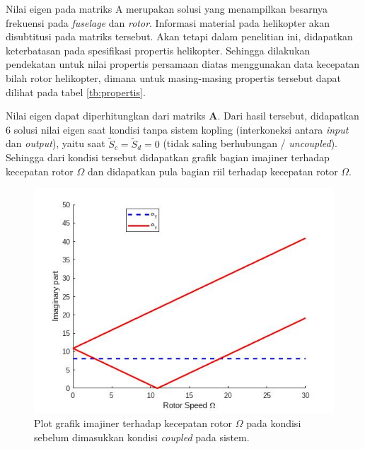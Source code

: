 Nilai eigen pada matriks A merupakan solusi yang menampilkan besarnya frekuensi pada \textit{fuselage} dan \textit{rotor}. Informasi material pada helikopter akan disubtitusi pada matriks tersebut. Akan tetapi dalam penelitian ini, didapatkan keterbatasan pada spesifikasi propertis helikopter. Sehingga dilakukan pendekatan untuk nilai propertis persamaan diatas menggunakan data kecepatan bilah rotor helikopter, dimana untuk masing-masing propertis tersebut dapat dilihat pada tabel \ref{tb:propertis}.

\begin{table}[h]
	\centering
	\caption{Pendekatan nilai propertis helikopter.}
	\label{tb:propertis}
\end{table}

Nilai eigen dapat diperhitungkan dari matriks $\mathbf{A}$. Dari hasil tersebut, didapatkan 6 solusi nilai eigen saat kondisi tanpa sistem kopling (interkoneksi antara \textit{input} dan \textit{output}), yaitu saat $\tilde{S}_c = \tilde{S}_d = 0$ (tidak saling berhubungan / \textit{uncoupled}). Sehingga dari kondisi tersebut didapatkan grafik bagian imajiner terhadap kecepatan rotor $\Omega$ dan didapatkan pula bagian riil terhadap kecepatan rotor $\Omega$.

\begin{figure}[H]
	\centering
	\includegraphics[width=0.7\linewidth]{gambar/Imag(uncoupled).jpg}
	\caption{Plot grafik imajiner terhadap kecepatan rotor $\Omega$ pada kondisi sebelum dimasukkan kondisi \textit{coupled} pada sistem.}
	\label{fig:imag(uncoupled)}
\end{figure}


